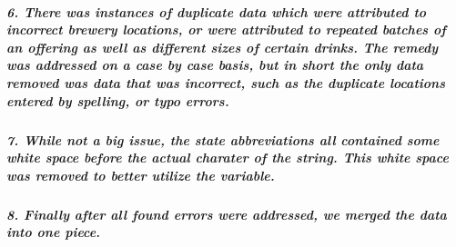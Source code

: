 \documentclass[
]{article}
\begin{document}
\hypertarget{there-was-instances-of-duplicate-data-which-were-attributed-to-incorrect-brewery-locations-or-were-attributed-to-repeated-batches-of-an-offering-as-well-as-different-sizes-of-certain-drinks.-the-remedy-was-addressed-on-a-case-by-case-basis-but-in-short-the-only-data-removed-was-data-that-was-incorrect-such-as-the-duplicate-locations-entered-by-spelling-or-typo-errors.}{%
\subparagraph{6. There was instances of duplicate data which were
attributed to incorrect brewery locations, or were attributed to
repeated batches of an offering as well as different sizes of certain
drinks. The remedy was addressed on a case by case basis, but in short
the only data removed was data that was incorrect, such as the duplicate
locations entered by spelling, or typo
errors.}\label{there-was-instances-of-duplicate-data-which-were-attributed-to-incorrect-brewery-locations-or-were-attributed-to-repeated-batches-of-an-offering-as-well-as-different-sizes-of-certain-drinks.-the-remedy-was-addressed-on-a-case-by-case-basis-but-in-short-the-only-data-removed-was-data-that-was-incorrect-such-as-the-duplicate-locations-entered-by-spelling-or-typo-errors.}}

\hypertarget{while-not-a-big-issue-the-state-abbreviations-all-contained-some-white-space-before-the-actual-charater-of-the-string.-this-white-space-was-removed-to-better-utilize-the-variable.}{%
\subparagraph{7. While not a big issue, the state abbreviations all
contained some white space before the actual charater of the string.
This white space was removed to better utilize the
variable.}\label{while-not-a-big-issue-the-state-abbreviations-all-contained-some-white-space-before-the-actual-charater-of-the-string.-this-white-space-was-removed-to-better-utilize-the-variable.}}

\hypertarget{finally-after-all-found-errors-were-addressed-we-merged-the-data-into-one-piece.}{%
\subparagraph{8. Finally after all found errors were addressed, we
merged the data into one
piece.}\label{finally-after-all-found-errors-were-addressed-we-merged-the-data-into-one-piece.}}
\end{document}

